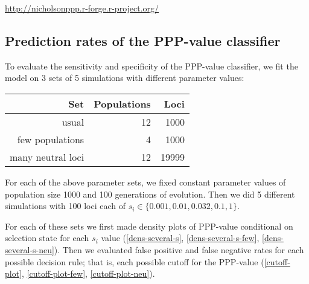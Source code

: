 \documentclass[a4paper,12pt]{article}
\begin{document}
 \url{http://nicholsonppp.r-forge.r-project.org/}

\subsection{Prediction rates of the PPP-value classifier}

To evaluate the sensitivity and specificity of the PPP-value
classifier, we fit the model on 3 sets of 5 simulations with different
parameter values:

\begin{tabular}{rrr}
  Set & Populations & Loci \\
  \hline
  usual & 12 & 1000 \\ %
  few populations & 4 & 1000\\   %
  many neutral loci & 12 & 19999   %
\end{tabular}

For each of the above parameter sets, we fixed constant parameter
values of population size 1000 and 100 generations of evolution. Then
we did 5 different simulations with 100 loci each of
$s_i\in\{0.001,0.01,0.032,0.1,1\}$.

For each of these sets we first made density plots of PPP-value
conditional on selection state for each $s_i$ value
(\autoref{dens-several-s}, \autoref{dens-several-s-few},
\autoref{dens-several-s-neu}).  Then we evaluated false positive and
false negative rates for each possible decision rule; that is, each
possible cutoff for the PPP-value (\autoref{cutoff-plot},
\autoref{cutoff-plot-few}, \autoref{cutoff-plot-neu}).




\end{document}
